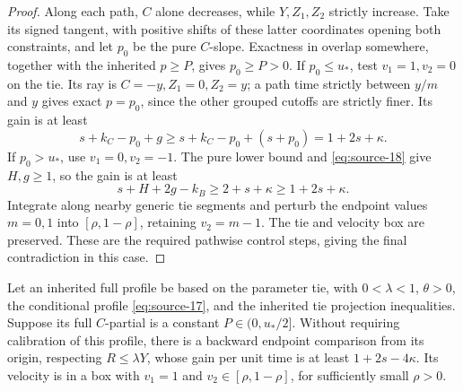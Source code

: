 \begin{proof}
Along each path, \(C\) alone decreases, while \(Y,Z_1,Z_2\)
strictly increase. Take its signed tangent, with positive shifts
of these latter coordinates opening both constraints, and let
\(p_0\) be the pure \(C\)-slope. Exactness in overlap
somewhere, together with the inherited \(p\ge P\), gives
\(p_0\ge P>0\). If \(p_0\le u_*\), test
\(v_1=1,v_2=0\) on the tie. Its ray is
\(C=-y,Z_1=0,Z_2=y\); a path time strictly between
\(y/m\) and \(y\) gives exact \(p=p_0\), since
the other grouped cutoffs are strictly finer. Its gain is at least
\[
s+k_C-p_0+g\ge s+k_C-p_0+(s+p_0)=1+2s+\kappa.
\]
If \(p_0>u_*\), use \(v_1=0,v_2=-1\).
The pure lower bound and \eqref{eq:source-18} give
\(H,g\ge1\), so the gain is at least
\[
s+H+2g-k_B\ge2+s+\kappa\ge1+2s+\kappa.
\]
Integrate along nearby generic tie segments and perturb the endpoint
values \(m=0,1\) into \([\rho,1-\rho]\), retaining
\(v_2=m-1\). The tie and velocity box are preserved.
These are the required pathwise control steps, giving the final
contradiction in this case.
\end{proof}

\begin{lemma}\label{asp:constrained}
Let an inherited full profile be based on the parameter tie, with
\(0<\lambda<1\), \(\theta>0\), the conditional profile
\eqref{eq:source-17}, and the inherited tie projection inequalities.
Suppose its full \(C\)-partial is a constant
\(P\in(0,u_*/2]\). Without requiring calibration of this profile,
there is a backward endpoint comparison from its origin, respecting
\(R\le\lambda Y\), whose gain per unit time is at least
\(1+2s-4\kappa\). Its velocity is in a box with \(v_1=1\)
and \(v_2\in[\rho,1-\rho]\), for sufficiently small \(\rho>0\).
\end{lemma}

